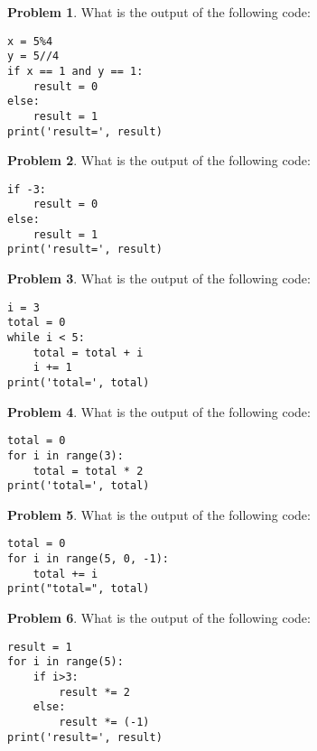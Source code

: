\documentclass[10pt]{article}
\theoremstyle{definition}
\newtheorem{problem}{Problem}
\begin{document}
\newpage
\begin{problem}
    What is the output of the following code:
\end{problem}
\begin{lstlisting}
x = 5%4
y = 5//4
if x == 1 and y == 1:
    result = 0
else:
    result = 1
print('result=', result)
\end{lstlisting}
\vspace{1.8in}


\begin{problem}
    What is the output of the following code:
\end{problem}
\begin{lstlisting}
if -3:
    result = 0
else:
    result = 1
print('result=', result)
\end{lstlisting}
\vspace{1.8in}


\begin{problem}
    What is the output of the following code:
\end{problem}
\begin{lstlisting}
i = 3
total = 0
while i < 5:
    total = total + i
    i += 1
print('total=', total)
\end{lstlisting}
\vspace{1.8in}


\begin{problem}
    What is the output of the following code:
\end{problem}
\begin{lstlisting}
total = 0
for i in range(3):
    total = total * 2
print('total=', total)
\end{lstlisting}
\vspace{2in}


\begin{problem}
    What is the output of the following code:
\end{problem}
\begin{lstlisting}
total = 0
for i in range(5, 0, -1):
    total += i
print("total=", total)
\end{lstlisting}
\vspace{2in}


\begin{problem}
    What is the output of the following code:
\end{problem}
\begin{lstlisting}
result = 1
for i in range(5):
    if i>3:
        result *= 2
    else:
        result *= (-1)
print('result=', result)
\end{lstlisting}
\vspace{2in}
\end{document}
